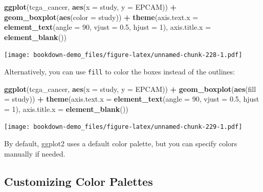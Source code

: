 \documentclass[
]{book}
\newenvironment{Shaded}{\begin{snugshade}}{\end{snugshade}}
\newcommand{\AttributeTok}[1]{\textcolor[rgb]{0.13,0.29,0.53}{#1}}
\newcommand{\DecValTok}[1]{\textcolor[rgb]{0.00,0.00,0.81}{#1}}
\newcommand{\FloatTok}[1]{\textcolor[rgb]{0.00,0.00,0.81}{#1}}
\newcommand{\FunctionTok}[1]{\textcolor[rgb]{0.13,0.29,0.53}{\textbf{#1}}}
\newcommand{\NormalTok}[1]{#1}
\newcommand{\SpecialCharTok}[1]{\textcolor[rgb]{0.81,0.36,0.00}{\textbf{#1}}}
\begin{document}
\begin{Shaded}
\begin{Highlighting}[]
\FunctionTok{ggplot}\NormalTok{(tcga\_cancer, }\FunctionTok{aes}\NormalTok{(}\AttributeTok{x =}\NormalTok{ study, }\AttributeTok{y =}\NormalTok{ EPCAM)) }\SpecialCharTok{+}
  \FunctionTok{geom\_boxplot}\NormalTok{(}\FunctionTok{aes}\NormalTok{(}\AttributeTok{color =}\NormalTok{ study)) }\SpecialCharTok{+}
  \FunctionTok{theme}\NormalTok{(}\AttributeTok{axis.text.x =} \FunctionTok{element\_text}\NormalTok{(}\AttributeTok{angle =} \DecValTok{90}\NormalTok{, }\AttributeTok{vjust =} \FloatTok{0.5}\NormalTok{, }\AttributeTok{hjust =} \DecValTok{1}\NormalTok{),}
        \AttributeTok{axis.title.x =} \FunctionTok{element\_blank}\NormalTok{())}
\end{Highlighting}
\end{Shaded}

\texttt{[image: bookdown-demo\_files/figure-latex/unnamed-chunk-228-1.pdf]}

Alternatively, you can use \texttt{fill} to color the boxes instead of the outlines:

\begin{Shaded}
\begin{Highlighting}[]
\FunctionTok{ggplot}\NormalTok{(tcga\_cancer, }\FunctionTok{aes}\NormalTok{(}\AttributeTok{x =}\NormalTok{ study, }\AttributeTok{y =}\NormalTok{ EPCAM)) }\SpecialCharTok{+}
  \FunctionTok{geom\_boxplot}\NormalTok{(}\FunctionTok{aes}\NormalTok{(}\AttributeTok{fill =}\NormalTok{ study)) }\SpecialCharTok{+}
  \FunctionTok{theme}\NormalTok{(}\AttributeTok{axis.text.x =} \FunctionTok{element\_text}\NormalTok{(}\AttributeTok{angle =} \DecValTok{90}\NormalTok{, }\AttributeTok{vjust =} \FloatTok{0.5}\NormalTok{, }\AttributeTok{hjust =} \DecValTok{1}\NormalTok{),}
        \AttributeTok{axis.title.x =} \FunctionTok{element\_blank}\NormalTok{())}
\end{Highlighting}
\end{Shaded}

\texttt{[image: bookdown-demo\_files/figure-latex/unnamed-chunk-229-1.pdf]}

By default, ggplot2 uses a default color palette, but you can specify colors manually if needed.

\hypertarget{customizing-color-palettes}{%
\subsection{Customizing Color Palettes}\label{customizing-color-palettes}}
\end{document}
